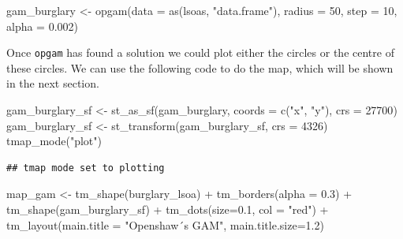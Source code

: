 \documentclass[
  krantz2]{krantz}
\makeatletter
\newenvironment{Shaded}{\begin{snugshade}}{\end{snugshade}}
\newcommand{\AttributeTok}[1]{\textcolor[rgb]{0.61,0.61,0.61}{#1}}
\newcommand{\DecValTok}[1]{\textcolor[rgb]{0.06,0.06,0.06}{#1}}
\newcommand{\FloatTok}[1]{\textcolor[rgb]{0.06,0.06,0.06}{#1}}
\newcommand{\FunctionTok}[1]{\textcolor[rgb]{0,0,0}{#1}}
\newcommand{\NormalTok}[1]{#1}
\newcommand{\OtherTok}[1]{\textcolor[rgb]{0.37,0.37,0.37}{#1}}
\newcommand{\SpecialCharTok}[1]{\textcolor[rgb]{0,0,0}{#1}}
\newcommand{\StringTok}[1]{\textcolor[rgb]{0.5,0.5,0.5}{#1}}
\newenvironment{kframe}{%
\medskip{}
\setlength{\fboxsep}{.8em}
 \def\at@end@of@kframe{}%
 \ifinner\ifhmode%
  \def\at@end@of@kframe{\end{minipage}}%
  \begin{minipage}{\columnwidth}%
 \fi\fi%
 \def\FrameCommand##1{\hskip\@totalleftmargin \hskip-\fboxsep
 \colorbox{shadecolor}{##1}\hskip-\fboxsep
     \hskip-\linewidth \hskip-\@totalleftmargin \hskip\columnwidth}%
 \MakeFramed {\advance\hsize-\width
   \@totalleftmargin\z@ \linewidth\hsize
   \@setminipage}}%
 {\par\unskip\endMakeFramed%
 \at@end@of@kframe}
\renewenvironment{Shaded}{\begin{kframe}}{\end{kframe}}
\makeatother
\begin{document}
\begin{Shaded}
\begin{Highlighting}[]
\NormalTok{gam\_burglary }\OtherTok{\textless{}{-}} \FunctionTok{opgam}\NormalTok{(}\AttributeTok{data =} \FunctionTok{as}\NormalTok{(lsoas, }\StringTok{"data.frame"}\NormalTok{), }
                   \AttributeTok{radius =} \DecValTok{50}\NormalTok{, }\AttributeTok{step =} \DecValTok{10}\NormalTok{, }\AttributeTok{alpha =} \FloatTok{0.002}\NormalTok{)}
\end{Highlighting}
\end{Shaded}

Once \texttt{opgam} has found a solution we could plot either the circles or the centre of these circles. We can use the following code to do the map, which will be shown in the next section.

\begin{Shaded}
\begin{Highlighting}[]
\NormalTok{gam\_burglary\_sf }\OtherTok{\textless{}{-}} \FunctionTok{st\_as\_sf}\NormalTok{(gam\_burglary, }
                      \AttributeTok{coords =} \FunctionTok{c}\NormalTok{(}\StringTok{"x"}\NormalTok{, }\StringTok{"y"}\NormalTok{),}
                      \AttributeTok{crs =} \DecValTok{27700}\NormalTok{)}
\NormalTok{gam\_burglary\_sf }\OtherTok{\textless{}{-}} \FunctionTok{st\_transform}\NormalTok{(gam\_burglary\_sf, }\AttributeTok{crs =} \DecValTok{4326}\NormalTok{)}
\FunctionTok{tmap\_mode}\NormalTok{(}\StringTok{"plot"}\NormalTok{)}
\end{Highlighting}
\end{Shaded}

\begin{verbatim}
## tmap mode set to plotting
\end{verbatim}

\begin{Shaded}
\begin{Highlighting}[]
\NormalTok{map\_gam }\OtherTok{\textless{}{-}} \FunctionTok{tm\_shape}\NormalTok{(burglary\_lsoa) }\SpecialCharTok{+} \FunctionTok{tm\_borders}\NormalTok{(}\AttributeTok{alpha =} \FloatTok{0.3}\NormalTok{) }\SpecialCharTok{+}
  \FunctionTok{tm\_shape}\NormalTok{(gam\_burglary\_sf) }\SpecialCharTok{+} \FunctionTok{tm\_dots}\NormalTok{(}\AttributeTok{size=}\FloatTok{0.1}\NormalTok{, }\AttributeTok{col =} \StringTok{"red"}\NormalTok{) }\SpecialCharTok{+}
  \FunctionTok{tm\_layout}\NormalTok{(}\AttributeTok{main.title =} \StringTok{"Openshaw´s GAM"}\NormalTok{, }\AttributeTok{main.title.size=}\FloatTok{1.2}\NormalTok{)}
\end{Highlighting}
\end{Shaded}
\end{document}
